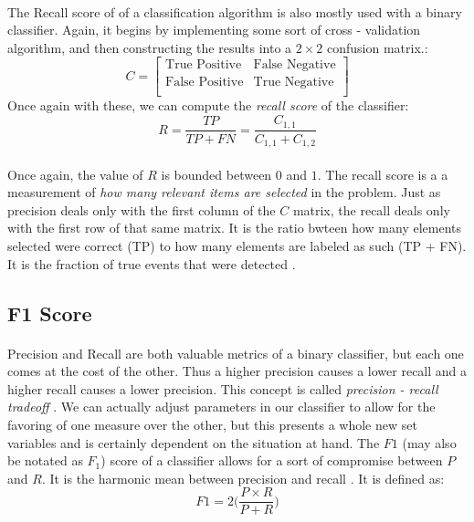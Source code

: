 \documentclass[12pt,letterpaper]{article}
\begin{document}
\paragraph*{}The Recall score of of a classification algorithm is also mostly used with a binary classifier. Again, it begins by implementing some sort of cross - validation algorithm, and then constructing the results into a $2 \times 2$ confusion matrix.:
\begin{equation}
C = 
\begin{bmatrix}
\text{True Positive} & \text{False Negative} \\
\text{False Positive} & \text{True Negative} \\
\end{bmatrix}
\end{equation}
Once again with these, we can compute the \textit{recall score} of the classifier:
\begin{equation}
\label{recall score}
R = \frac{TP}{TP + FN} = \frac{C_{1,1}}{C_{1,1}+C_{1,2}}
\end{equation}
\paragraph*{}Once again, the value of $R$ is bounded between $0$ and $1$. The recall score is a a measurement of \textit{how many relevant items are selected} in the problem. Just as precision deals only with the first column of the $C$ matrix, the recall deals only with the first row of that same matrix. It is the ratio bwteen how many elements selected were correct (TP) to how many elements are labeled as such (TP + FN). It is the fraction of true events that were detected \cite{Goodfellow}.


\subsection{F1 Score}
\paragraph*{}Precision and Recall are both valuable metrics of a binary classifier, but each one comes at the cost of the other. Thus a higher precision causes a lower recall and a higher recall causes a lower precision. This concept is called \textit{precision - recall tradeoff} \cite{Geron}. We can actually adjust parameters in our classifier to allow for the favoring of one measure over the other, but this presents a whole new set variables and is certainly dependent on the situation at hand.  The $F1$ (may also be notated as $F_1$) score of a classifier allows for a sort of compromise between $P$ and $R$. It is the harmonic mean between precision and recall \cite{Goodfellow}. It is defined as:
\begin{equation}
\label{F1 score}
F1 = 2\Big(\frac{P \times R}{P + R}\Big)
\end{equation}
\end{document}
